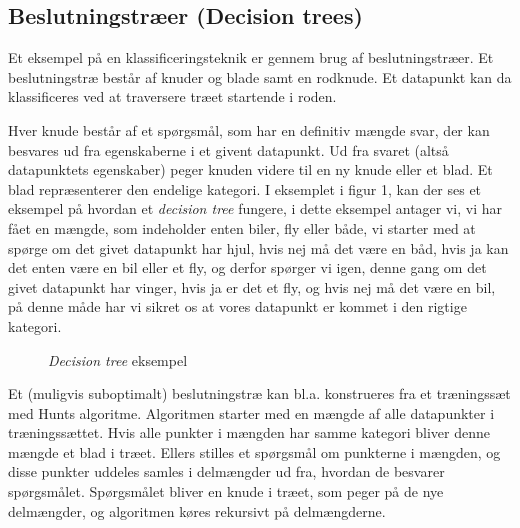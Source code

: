 \documentclass{article}
\begin{document}
\subsection{Beslutningstræer (Decision trees)}
Et eksempel på en klassificeringsteknik er gennem brug af beslutningstræer. Et beslutningstræ består af knuder og blade samt en rodknude. Et datapunkt kan da klassificeres ved at traversere træet startende i roden.

Hver knude består af et spørgsmål, som har en definitiv mængde svar, der kan besvares ud fra egenskaberne i et givent datapunkt. Ud fra svaret (altså datapunktets egenskaber) peger knuden videre til en ny knude eller et blad. Et blad repræsenterer den endelige kategori. I eksemplet i figur 1, kan der ses et eksempel på hvordan et \textit{decision tree} fungere, i dette eksempel antager vi, vi har fået en mængde, som indeholder enten biler, fly eller både, vi starter med at spørge om det givet datapunkt har hjul, hvis nej må det være en båd, hvis ja kan det enten være en bil eller et fly, og derfor spørger vi igen, denne gang om det givet datapunkt har vinger, hvis ja er det et fly, og hvis nej må det være en bil, på denne måde har vi sikret os at vores datapunkt er kommet i den rigtige kategori.

\begin{figure}[H]
\begin{center}
\end{center}
\caption{\textit{Decision tree} eksempel}
\end{figure}

Et (muligvis suboptimalt) beslutningstræ kan bl.a. konstrueres fra et træningssæt med Hunts algoritme. Algoritmen starter med en mængde af alle datapunkter i træningssættet. Hvis alle punkter i mængden har samme kategori bliver denne mængde et blad i træet. Ellers stilles et spørgsmål om punkterne i mængden, og disse punkter uddeles samles i delmængder ud fra, hvordan de besvarer spørgsmålet. Spørgsmålet bliver en knude i træet, som peger på de nye delmængder, og algoritmen køres rekursivt på delmængderne.
\end{document}
